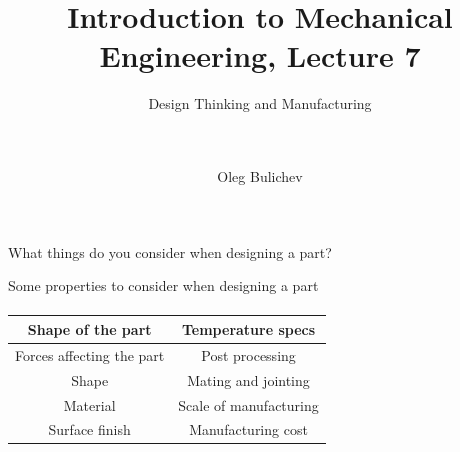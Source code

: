 \documentclass[aspectratio=169]{beamer}
\title[IME]{Introduction to Mechanical Engineering, Lecture 7} %
\subtitle{Design Thinking and Manufacturing  
\\ \   \\   
\ } %
\author{Oleg Bulichev}
\newcommand{\fbckg}[1]{\usebackgroundtemplate{\texttt{[image: \#1]}}}%
\begin{document}
\setlength{\abovedisplayskip}{0pt}
\setlength{\belowdisplayskip}{0pt}
\setlength{\abovedisplayshortskip}{0pt}
\setlength{\belowdisplayshortskip}{0pt}

\fbckg{fibeamer/figs/title_page.png}

\fbckg{fibeamer/figs/common.png}

\note{\scriptsize \begin{itemize}
        \item \
    \end{itemize}}

\begin{frame}[c]{}
    \framesubtitle{}
        \LARGE \centering
        What things do you consider when designing a part?
    \end{frame}

\begin{frame}[c]{Some properties to consider when designing a part}
\framesubtitle{}
\begin{table}[H]
    \LARGE
    \centering
    \begin{tabular}{|c|c|}
    \hline
        \textbf{Shape of the part} & \textbf{Temperature specs} \\ \hline
        Forces affecting the part & Post processing \\ 
        Shape & Mating and jointing \\ 
        Material & Scale of manufacturing \\ 
        Surface finish & Manufacturing cost \\ \hline
    \end{tabular}
\end{table}
\end{frame}
\end{document}
